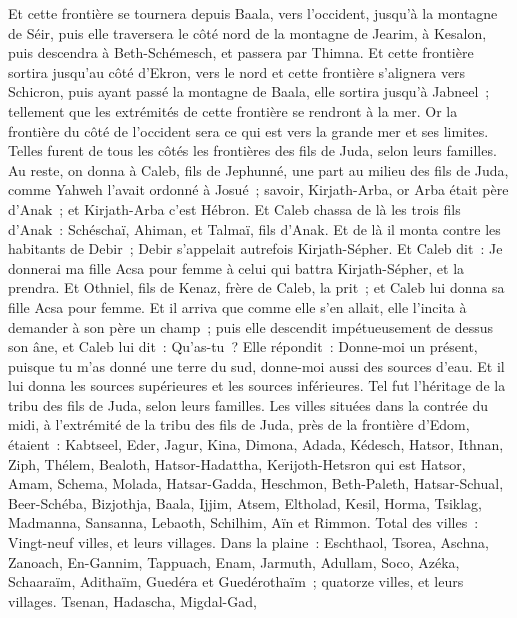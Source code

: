 \begin{multicols}{2}
Et cette frontière se tournera depuis Baala, vers l'occident, jusqu'à la montagne de Séir, puis elle traversera le côté nord de la montagne de Jearim, à Kesalon, puis descendra à Beth-Schémesch, et passera par Thimna.
Et cette frontière sortira jusqu'au côté d'Ekron, vers le nord et cette frontière s'alignera vers Schicron, puis ayant passé la montagne de Baala, elle sortira jusqu'à Jabneel~; tellement que les extrémités de cette frontière se rendront à la mer.
Or la frontière du côté de l'occident sera ce qui est vers la grande mer et ses limites. Telles furent de tous les côtés les frontières des fils de Juda, selon leurs familles.
Au reste, on donna à Caleb, fils de Jephunné, une part au milieu des fils de Juda, comme Yahweh l'avait ordonné à Josué~; savoir, Kirjath-Arba, or Arba était père d'Anak~; et Kirjath-Arba c'est Hébron.
Et Caleb chassa de là les trois fils d'Anak~: Schéschaï, Ahiman, et Talmaï, fils d'Anak.
Et de là il monta contre les habitants de Debir~; Debir s'appelait autrefois Kirjath-Sépher.
Et Caleb dit~: Je donnerai ma fille Acsa pour femme à celui qui battra Kirjath-Sépher, et la prendra.
Et Othniel, fils de Kenaz, frère de Caleb, la prit~; et Caleb lui donna sa fille Acsa pour femme.
Et il arriva que comme elle s'en allait, elle l'incita à demander à son père un champ~; puis elle descendit impétueusement de dessus son âne, et Caleb lui dit~: Qu'as-tu~?
Elle répondit~: Donne-moi un présent, puisque tu m'as donné une terre du sud, donne-moi aussi des sources d'eau. Et il lui donna les sources supérieures et les sources inférieures.
Tel fut l'héritage de la tribu des fils de Juda, selon leurs familles.
Les villes situées dans la contrée du midi, à l'extrémité de la tribu des fils de Juda, près de la frontière d'Edom, étaient~: Kabtseel, Eder, Jagur,
Kina, Dimona, Adada,
Kédesch, Hatsor, Ithnan,
Ziph, Thélem, Bealoth,
Hatsor-Hadattha, Kerijoth-Hetsron qui est Hatsor,
Amam, Schema, Molada,
Hatsar-Gadda, Heschmon, Beth-Paleth,
Hatsar-Schual, Beer-Schéba, Bizjothja,
Baala, Ijjim, Atsem,
Eltholad, Kesil, Horma,
Tsiklag, Madmanna, Sansanna,
Lebaoth, Schilhim, Aïn et Rimmon. Total des villes~: Vingt-neuf villes, et leurs villages.
Dans la plaine~: Eschthaol, Tsorea, Aschna,
Zanoach, En-Gannim, Tappuach, Enam,
Jarmuth, Adullam, Soco, Azéka,
Schaaraïm, Adithaïm, Guedéra et Guedérothaïm~; quatorze villes, et leurs villages.
Tsenan, Hadascha, Migdal-Gad,

\end{multicols}
